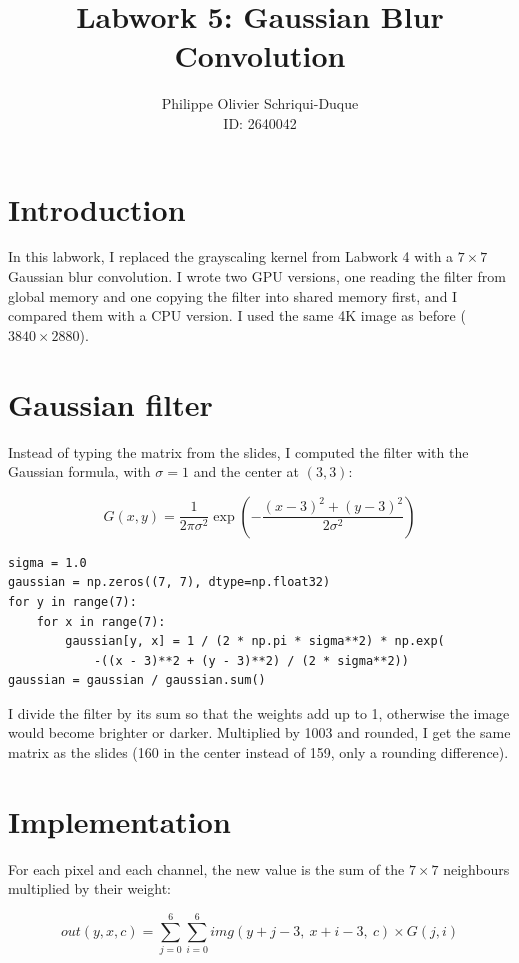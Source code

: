 \documentclass{report}
\begin{document}
\title{Labwork 5: Gaussian Blur Convolution}
\author{Philippe Olivier Schriqui-Duque \\ ID: 2640042}
\date{}
\maketitle

\section*{Introduction}

In this labwork, I replaced the grayscaling kernel from Labwork 4 with a $7 \times 7$ Gaussian blur convolution. I wrote two GPU versions, one reading the filter from global memory and one copying the filter into shared memory first, and I compared them with a CPU version. I used the same 4K image as before ($3840 \times 2880$).

\section*{Gaussian filter}

Instead of typing the matrix from the slides, I computed the filter with the Gaussian formula, with $\sigma = 1$ and the center at $(3, 3)$:

\[
G(x, y) = \frac{1}{2\pi\sigma^2} \exp\left(-\frac{(x-3)^2 + (y-3)^2}{2\sigma^2}\right)
\]

\begin{verbatim}
sigma = 1.0
gaussian = np.zeros((7, 7), dtype=np.float32)
for y in range(7):
    for x in range(7):
        gaussian[y, x] = 1 / (2 * np.pi * sigma**2) * np.exp(
            -((x - 3)**2 + (y - 3)**2) / (2 * sigma**2))
gaussian = gaussian / gaussian.sum()
\end{verbatim}

I divide the filter by its sum so that the weights add up to 1, otherwise the image would become brighter or darker. Multiplied by 1003 and rounded, I get the same matrix as the slides (160 in the center instead of 159, only a rounding difference).

\section*{Implementation}

For each pixel and each channel, the new value is the sum of the $7 \times 7$ neighbours multiplied by their weight:

\[
out(y, x, c) = \sum_{j=0}^{6} \sum_{i=0}^{6} img(y + j - 3,\ x + i - 3,\ c) \times G(j, i)
\]
\end{document}

